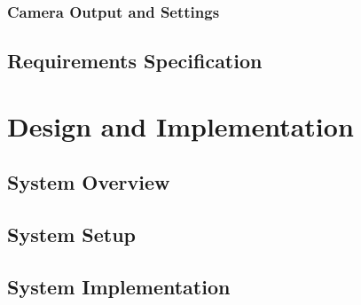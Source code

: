 %			
	
		\subsection{Camera Output and Settings}
			\label{sec:camera}
			
	
%			
	
					
	\section{Requirements Specification}
		\label{sec:reqspec}
		

\chapter{Design and Implementation}
	\label{solution}
	
	
	\section{System Overview}
		\label{sec:sysdesign}
		

	\section{System Setup}
		\label{sec:setup}
		
		
	
	\section{System Implementation}
		\label{sec:implementation}
		
		

